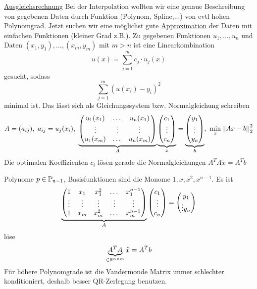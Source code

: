 \documentclass[../Skript.tex]{subfiles}
\begin{document}
\underline{Ausgleichsrechnung}
Bei der Interpolation wollten wir eine genaue Beschreibung von gegebenen Daten durch
Funktion (Polynom, Spline,...) von evtl hohen Polynomgrad. Jetzt suchen wir eine möglichst
gute \underline{Approximation} der Daten mit einfachen Funktionen (kleiner Grad z.B.).
Zu gegebenen Funktionen $u_1,\dots, u_n$ und Daten $(x_1,y_1),\dots,(x_m,y_m)$ mit $m>n$
ist eine Linearkombination \[
    u(x) = \sum_{j=1}^m c_j \cdot u_j(x) \]
gesucht, sodass \[
    \sum_{j=1}^m (u(x_i)- y_i)^2\]
minimal ist. Das lässt sich als Gleichungssystem bzw. Normalgleichung schreiben
\[
    A= (a_{ij}), \ a_{ij} = u_j(x_i), \ \underbrace{\begin{pmatrix}
        u_1(x_1)&\dots & u_n(x_1)\\
        \vdots & \vdots & \vdots \\
        u_1(x_m) & \dots & u_n(x_m) 
    \end{pmatrix}}_{A} \underbrace{\begin{pmatrix}c_1\\\vdots\\c_n\end{pmatrix}}_{x} = \underbrace{\begin{pmatrix}y_1\\\vdots\\y_n\end{pmatrix}}_b, \ \min_x\left\vert\left\vert Ax - b\right\vert\right\vert^2_2\]
Die optimalen Koeffizienten $c_i$ lösen gerade die Normalgleichungen $A^TA\tilde{x} = A^T b$
\begin{example}
    Polynome $p\in \Pol{n-1}$, Basisfunktionen sind die Monome $1, x, x^2, x^{n-1}$. Es ist \[
        \underbrace{\begin{pmatrix}1 & x_1 & x_1^2 &\dots & x_1^{n-1} \\\vdots & \vdots & \vdots & \vdots& \vdots\\
        1 & x_m & x_m^2 & \dots & x_m^{n-1}\end{pmatrix}}_A \begin{pmatrix}c_1\\\vdots\\c_n\end{pmatrix} = \begin{pmatrix}y_1\\\vdots y_n\end{pmatrix}\]
    löse \[\underbrace{A^TA}_{\in \Rnm{}{}} \tilde{x} = A^T b\]
    Für höhere Polynomgrade ist die Vandermonde Matrix immer schlechter konditioniert, deshalb
    besser QR-Zerlegung benutzen.
\end{example}
\end{document}
